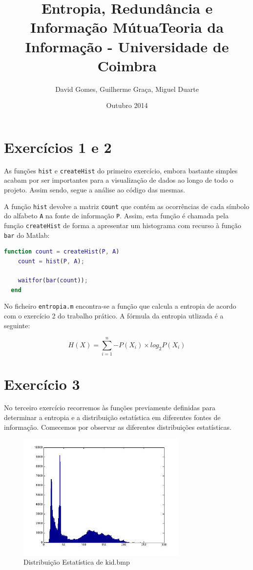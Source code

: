 \documentclass[12pt]{article}
\title{Entropia, Redundância e Informação Mútua}
\title{Teoria da Informação - Universidade de Coimbra}
\author{David Gomes, Guilherme Graça, Miguel Duarte}
\date{Outubro 2014}
\begin{document}
\maketitle

\section{Exercícios 1 e 2}
  As funções \texttt{hist} e \texttt{createHist} do primeiro exercício, embora bastante
  simples acabam por ser importantes para a visualização de dados ao longo
  de todo o projeto. Assim sendo, segue a análise ao código das mesmas.

  A função \texttt{hist} devolve a matriz \texttt{count} que contém as ocorrências
  de cada símbolo do alfabeto \texttt{A} na fonte de informação \texttt{P}. Assim,
  esta função é chamada pela função \texttt{createHist} de forma a apresentar um histograma
  com recurso à função \texttt{bar} do Matlab:

  \vspace{2mm}
  \begin{lstlisting}[language=Matlab]
  function count = createHist(P, A)
    count = hist(P, A);

    waitfor(bar(count));
  end
  \end{lstlisting}

  No ficheiro \texttt{entropia.m} encontra-se a função que calcula a entropia de acordo
  com o exercício 2 do trabalho prático. A fórmula da entropia utlizada é a seguinte:

  $$
    H(X) = \sum_{i=1}^{n}{-P(X_i) \times log_2 P(X_i)}
  $$

\section{Exercício 3}
  No terceiro exercício recorremos às funções previamente definidas para determinar
  a entropia e a distribuição estatística em diferentes fontes de informação.
  Comecemos por observar as diferentes distribuições estatísticas.

  \begin{figure}[H]
    \centering
      \includegraphics[width=0.75\textwidth]{ex3kid}
    \caption{Distribuição Estatística de kid.bmp}
  \end{figure}
\end{document}
